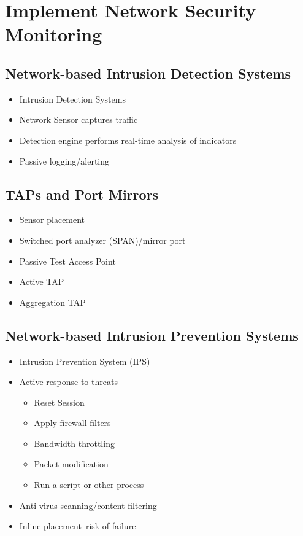 \section {Implement Network Security Monitoring}
	\subsection {Network-based Intrusion Detection Systems}
		\begin{itemize}
			\item Intrusion Detection Systems
			\item Network Sensor captures traffic
			\item Detection engine performs real-time analysis of indicators
			\item Passive logging/alerting
		\end{itemize}
	\subsection {TAPs and Port Mirrors}
		\begin{itemize}
			\item Sensor placement
			\item Switched port analyzer (SPAN)/mirror port
			\item Passive Test Access Point
			\item Active TAP
			\item Aggregation TAP
		\end{itemize}
	\subsection {Network-based Intrusion Prevention Systems}
		\begin{itemize}
			\item Intrusion Prevention System (IPS)
			\item Active response to threats
				\begin{itemize}
					\item Reset Session
					\item Apply firewall filters
					\item Bandwidth throttling
					\item Packet modification
					\item Run a script or other process
				\end{itemize}
			\item Anti-virus scanning/content filtering
			\item Inline placement--risk of failure
		\end{itemize}
